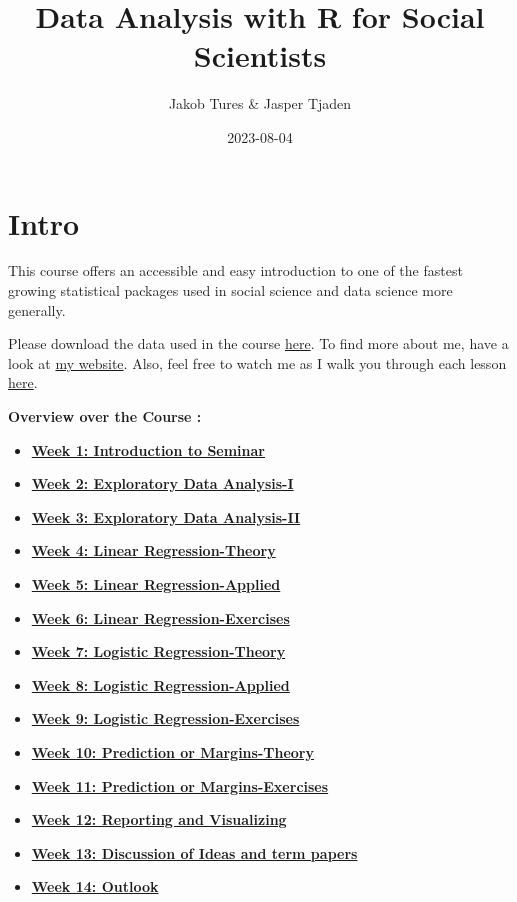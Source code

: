 \documentclass[
]{book}
\title{Data Analysis with R for Social Scientists}
\author{Jakob Tures \& Jasper Tjaden}
\date{2023-08-04}
\providecommand{\tightlist}{%
  \setlength{\itemsep}{0pt}\setlength{\parskip}{0pt}}
\begin{document}
\maketitle

{
\setcounter{tocdepth}{1}
\tableofcontents
}
\hypertarget{intro}{%
\chapter*{Intro}\label{intro}}

This course offers an accessible and easy introduction to one of the fastest growing statistical packages used in social science and data science more generally.

Please download the data used in the course \href{https://www.worldvaluessurvey.org/WVSDocumentationWV7.jsp}{here}. To find more about me, have a look at \href{https://jaspertjaden.com}{my website}. Also, feel free to watch me as I walk you through each lesson \href{https://www.youtube.com/playlist?list=PLr43hk2e3hFMg4tZdJsN0qzG5YkQB3A1c}{here}.

\textbf{Overview over the Course :}

\begin{itemize}
\tightlist
\item
  \textbf{\protect\hyperlink{intro-sem}{Week 1: Introduction to Seminar}}
\item
  \textbf{\protect\hyperlink{eda-1}{Week 2: Exploratory Data Analysis-I}}
\item
  \textbf{\protect\hyperlink{eda-2}{Week 3: Exploratory Data Analysis-II}}
\item
  \textbf{\protect\hyperlink{lin-t}{Week 4: Linear Regression-Theory}}
\item
  \textbf{\protect\hyperlink{lin-a}{Week 5: Linear Regression-Applied}}
\item
  \textbf{\protect\hyperlink{lin-e}{Week 6: Linear Regression-Exercises}}
\item
  \textbf{\protect\hyperlink{log-t}{Week 7: Logistic Regression-Theory}}
\item
  \textbf{\protect\hyperlink{log-a}{Week 8: Logistic Regression-Applied}}
\item
  \textbf{\protect\hyperlink{log-e}{Week 9: Logistic Regression-Exercises}}
\item
  \textbf{\protect\hyperlink{pm-t}{Week 10: Prediction or Margins-Theory}}
\item
  \textbf{\protect\hyperlink{pm-e}{Week 11: Prediction or Margins-Exercises}}
\item
  \textbf{\protect\hyperlink{report-v}{Week 12: Reporting and Visualizing}}
\item
  \textbf{\protect\hyperlink{dis-paper}{Week 13: Discussion of Ideas and term papers}}
\item
  \textbf{\protect\hyperlink{out-look}{Week 14: Outlook}}
\end{itemize}
\end{document}
